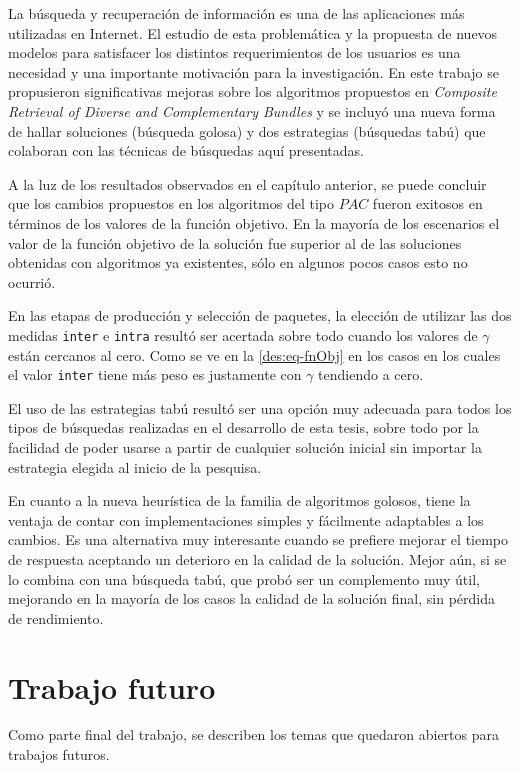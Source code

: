 La búsqueda y recuperación de información es una de las aplicaciones más utilizadas en Internet. El estudio de esta problemática y la propuesta de nuevos modelos para satisfacer los distintos requerimientos de los usuarios es una necesidad y una importante motivación para la investigación. En este trabajo se propusieron significativas mejoras sobre los algoritmos propuestos en {\em Composite Retrieval of Diverse and Complementary Bundles} y se incluyó una nueva forma de hallar soluciones (búsqueda golosa) y dos estrategias (búsquedas tabú) que colaboran con las técnicas de búsquedas aquí presentadas.

A la luz de los resultados observados en el capítulo anterior, se puede concluir que los cambios propuestos en los algoritmos del tipo $PAC$ fueron exitosos en términos de los valores de la función objetivo. En la mayoría de los escenarios el valor de la función objetivo de la solución fue superior al de las soluciones obtenidas con algoritmos ya existentes, sólo en algunos pocos casos esto no ocurrió. 

En las etapas de producción y selección de paquetes, la elección de utilizar las dos medidas \texttt{inter} e \texttt{intra} resultó ser acertada sobre todo cuando los valores de $\gamma$ están cercanos al cero. Como se ve en la \autoref{des:eq-fnObj} en los casos en los cuales el valor \texttt{inter} tiene más peso es justamente con $\gamma$ tendiendo a cero.

El uso de las estrategias tabú resultó ser una opción muy adecuada para todos los tipos de búsquedas realizadas en el desarrollo de esta tesis, sobre todo por la facilidad de poder usarse a partir de cualquier solución inicial sin importar la estrategia elegida al inicio de la pesquisa.

En cuanto a la nueva heurística de la familia de algoritmos golosos, tiene la ventaja de contar con implementaciones simples y fácilmente adaptables a los cambios. Es una alternativa muy interesante cuando se prefiere mejorar el tiempo de respuesta aceptando un deterioro en la calidad de la solución. Mejor aún, si se lo combina con una búsqueda tabú, que probó ser un complemento muy útil, mejorando en la mayoría de los casos la calidad de la solución final, sin pérdida de rendimiento. 

\section{Trabajo futuro} 
Como parte final del trabajo, se describen los temas que quedaron abiertos para trabajos futuros. 

